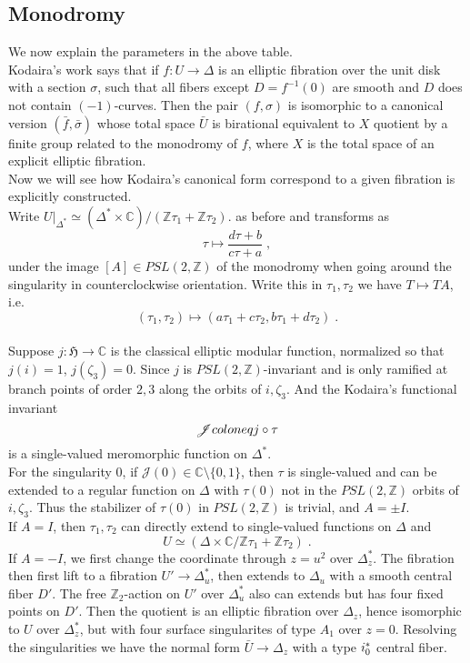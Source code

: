 \subsection{Monodromy}
\indent  We now explain the parameters in the above table.\\ \indent
Kodaira's work \cite{kodaira1963compact} says that if $f\colon U\rightarrow \Delta$ is an elliptic fibration over the unit disk with a section $\sigma$, such that all fibers except $D=f^{-1}(0)$ are smooth and $D$ does not contain $(-1)$-curves. Then the pair $(f,\sigma)$ is isomorphic to a canonical version $(\bar{f},\bar{\sigma})$ whose total space $\bar{U}$ is birational equivalent to $X$ quotient by a finite group related to the monodromy of $f$, where $X$ is the total space of an explicit elliptic fibration.\\ \indent
Now we will see how Kodaira's canonical form correspond to a given fibration is explicitly constructed.\\ \indent
Write $U|_{\Delta^*}\simeq(\Delta^*\times\mathbb{C})/(\mathbb{Z}\tau_1+\mathbb{Z}\tau_2).$ as before and transforms as
\[ \tau \mapsto \frac{d\tau+b}{c\tau+a}\; , \]
under the image $[A]\in PSL(2,\mathbb{Z})$ of the monodromy when going around the singularity in counterclockwise orientation. Write this in $\tau_1,\tau_2$ we have $T\mapsto TA$, i.e.
\[ (\tau_1,\tau_2)\mapsto(a\tau_1+c\tau_2,b\tau_1+d\tau_2 )\; . \]\\ \indent
Suppose $j\colon\mathfrak{H}\rightarrow\mathbb{C}$ is the classical elliptic modular function, normalized so that $j(i)=1$, $j(\zeta_3)=0$. Since $j$ is $PSL(2,\mathbb{Z})$-invariant and is only ramified at branch points of order $2,3$ along the orbits of $i,\zeta_3$. And the Kodaira's functional invariant 
\[ \mathscr{J}\\coloneq j\circ \tau \]
is a single-valued meromorphic function on $\Delta^*$.\\ \indent
For the singularity 0, if $\mathscr{J}(0)\in\mathbb{C}\setminus \{0,1\}$, then $\tau$ is single-valued and can be extended to a regular function on $\Delta$ with $\tau(0)$ not in the $PSL(2,\mathbb{Z})$ orbits of $i,\zeta_3$. Thus the stabilizer of $\tau(0)$ in $PSL(2,\mathbb{Z})$ is trivial, and $A=\pm I$.\\ \indent
If $A=I$, then $\tau_1,\tau_2$ can directly extend to single-valued functions on $\Delta$ and \[ U\simeq (\Delta\times\mathbb{C}/\mathbb{Z}\tau_1+\mathbb{Z}\tau_2)\; . \]
\indent If $A=-I$, we first change the coordinate through $z=u^2$ over $\Delta_z^*$. The fibration then first lift to a fibration $U'\rightarrow \Delta_u^*$, then extends to $\Delta_u$ with a smooth central fiber $D'$. The free $\mathbb{Z}_2$-action on $U'$ over $\Delta_u^*$ also can extends but has four fixed points on $D'$. Then the quotient is an elliptic fibration over $\Delta_z$, hence isomorphic to $U$ over $\Delta_z^*$, but with four surface singularites of type $A_1$ over $z=0$. Resolving the singularities we have the normal form $\bar{U}\rightarrow \Delta_z$ with a type $\uppercase\expandafter{\romannumeral1}_0^*$ central fiber. \\ \indent
